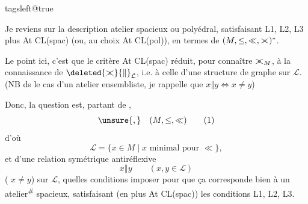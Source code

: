 \begingroup\csname tagsleft@true\endcsname

Je reviens sur la description  atelier spacieux ou polyédral, satisfaisant L1, L2, L3 plus  At CL(spac) (ou, au choix At CL(pol)), en termes de $(M,\leq,\ll,\mathrel{>\mkern-10mu<})^{*}$.

Le point ici, c'est que le critère At CL(spac) réduit, pour connaître \({\mathrel{>\mkern-10mu<}}_M\), à la connaissance de $\deleted{\mathrel{>\mkern-10mu<}}{\Vert}_{\mathcal L}$, i.e. à celle d'une structure de graphe sur $\mathcal L$. (NB ds le cas d'un atelier ensembliste, je rappelle que $x\mathrel{\Vert}y\Longleftrightarrow x\neq y$)

Donc, la question est, partant de , 
\[
\unsure{,}\quad(M,\leq,\ll)\tag*{(1)}
\]
d'où
\[
\mathcal L=\{x\in M\mid x\text{ minimal pour }\ll\},\tag*{(2)}
\]
et d'une relation symétrique antiréflexive
\[
x\mathrel{\Vert}y\qquad(x,y\in\mathcal L)
\]
( $x\neq y$) sur $\mathcal L$, quelles conditions imposer pour que ça corresponde bien à un atelier\textsuperscript{\#} spacieux, satisfaisant  (en plus At CL(spac)) les conditions L1, L2, L3.

